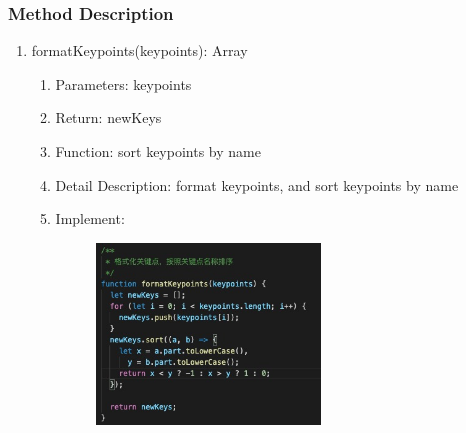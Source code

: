 \documentclass[16pt]{scrreprt}
\begin{document}
\subsubsection{Method Description}
\begin{enumerate}
    \item formatKeypoints(keypoints): Array
        \begin{enumerate}
            \item Parameters: keypoints
            \item Return: newKeys
            \item Function: sort keypoints by name
            \item Detail Description: format keypoints, and sort keypoints by name
            \item Implement:
                \begin{figure}[H]
                    \centering
                    \includegraphics[width=0.6\textwidth]{diagrams/comparison-0.jpg}\\
                \end{figure}
        \end{enumerate}


\end{enumerate}
\end{document}

